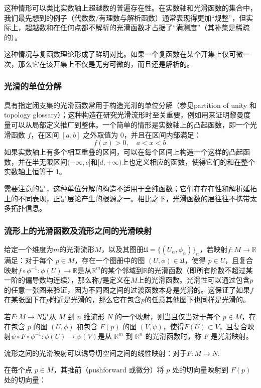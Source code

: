 这种情形可以类比实数轴上超越数的普遍存在性。在实数轴和光滑函数的集合中，我们最先想到的例子（代数数/有理数与解析函数）通常表现得更加“规整”，但实际上，超越数和在任何点都不解析的光滑函数才占据了“满测度”（其补集是稀疏的）。

这种情况与复函数理论形成了鲜明对比。如果一个复函数在某个开集上仅可微一次，那么它在该开集上不仅是无穷可微的，而且还是解析的。
\subsubsection{光滑的单位分解}
具有指定闭支集的光滑函数常用于构造光滑的单位分解（参见partition of unity 和topology glossary）；这种构造在研究光滑流形时至关重要，例如用来证明黎曼度量可以从局部定义推广到整体。一个简单的情形是实数轴上的凸起函数，即一个光滑函数 $f$，在区间 $[a,b]$ 之外取值为 0，并且在区间内部满足：
$$
f(x) > 0, \quad a < x < b~
$$
如果实数轴上有多个相互重叠的区间，可以在每个区间上构造一个这样的凸起函数，并在半无限区间$(-\infty, c]$和$[d, +\infty)$上也定义相应的函数，使得它们的和在整个实数轴上恒等于 1。

需要注意的是，这种单位分解的构造不适用于全纯函数；它们在存在性和解析延拓上的不同表现，正是层论产生的根源之一。相比之下，光滑函数的层往往不携带太多拓扑信息。
\subsubsection{流形上的光滑函数及流形之间的光滑映射}
给定一个维度为$m$的光滑流形$M$，以及其图册$\mathfrak{U} = \{(U_\alpha, \phi_\alpha)\}_\alpha$，若映射$f: M \to \mathbb{R}$满足：对于每个 $p \in M$，存在一个图册中的图 $(U, \phi) \in \mathfrak{U}$，使得 $p \in U$，且复合映射$f \circ \phi^{-1} : \phi(U) \to \mathbb{R}$是从$\mathbb{R}^m$的某个邻域到$\mathbb{R}$的光滑函数（即所有阶数不超过某一阶的偏导数均连续），那么称$f$是定义在$M$上的光滑函数。光滑性可以通过包含$p$的任意一张图来验证，因为不同图之间的过渡函数本身是光滑的。这保证了如果$f$在某张图下在$p$附近是光滑的，那么它在包含$p$的任意其他图下也同样是光滑的。

若$F: M \to N$是从 $M$ 到 $n$ 维流形 $N$ 的一个映射，则当且仅当对于每个 $p \in M$，存在包含 $p$ 的图 $(U, \phi)$ 和包含 $F(p)$ 的图 $(V, \psi)$，使得$F(U) \subset V$，且复合映射$\psi \circ F \circ \phi^{-1} : \phi(U) \to \psi(V)$是从 $\mathbb{R}^m$ 到 $\mathbb{R}^n$ 的光滑函数时，称 $F$ 是光滑映射。

流形之间的光滑映射可以诱导切空间之间的线性映射：对于$F: M \to N,$

在每个点 $p \in M$，其\*\*推前（pushforward 或微分）\*\*将 $p$ 处的切向量映射到 $F(p)$ 处的切向量：

